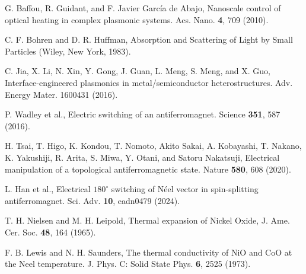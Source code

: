 \documentclass[aps,prl,reprint,floatfix,longbibliography,twocolumn]{revtex4-2}
\begin{document}
\begin{thebibliography}{}
 G. Baffou, R. Guidant, and F. Javier Garc\'{i}a de Abajo, Nanoscale control of optical heating in complex plasmonic systems. Acs. Nano. \textbf{4}, 709 (2010).

 C. F. Bohren and D. R. Huffman, Absorption and Scattering of Light by Small Particles (Wiley, New York, 1983).

 C. Jia, X. Li, N. Xin, Y. Gong, J. Guan, L. Meng, S. Meng, and X. Guo, Interface-engineered plasmonics in metal/semiconductor heterostructures. Adv. Energy Mater. 1600431 (2016).

 P. Wadley et al., Electric switching of an antiferromagnet. Science \textbf{351}, 587 (2016).

 H. Tsai, T. Higo, K. Kondou,  T. Nomoto, Akito Sakai,
A. Kobayashi, T. Nakano, K. Yakushiji, R. Arita, S. Miwa, Y. Otani, and Satoru Nakatsuji, Electrical manipulation of a topological
antiferromagnetic state. Nature \textbf{580}, 608 (2020).

 L. Han et al., Electrical $180^\circ$ switching of Néel vector in spin-splitting antiferromagnet. Sci. Adv. \textbf{10}, eadn0479 (2024).

 T. H. Nielsen and M. H. Leipold, Thermal expansion of Nickel Oxide, J. Ame. Cer. Soc. \textbf{48}, 164 (1965).

 F. B. Lewis and N. H. Saunders, The thermal conductivity of NiO and CoO at the Neel temperature. J. Phys. C: Solid State Phys. \textbf{6}, 2525 (1973).
\end{thebibliography}{}
\end{document}
